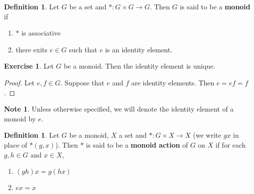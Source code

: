 \documentclass[12pt]{amsart}
\theoremstyle{definition}
\newtheorem{defn}[definition]{Definition}
\newtheorem{note}[definition]{Note}
\newtheorem{ex}[definition]{Exercise}
\begin{document}
	\begin{defn}
	Let $G$ be a set and $*: G \times G \rightarrow G$. Then $G$ is said to be a \textbf{monoid} if 
	\begin{enumerate}
	\item $*$ is associative
	\item there exits $e \in G$ such that $e$ is an identity element.
	\end{enumerate}
	\end{defn}	
	
	\begin{ex}
	Let $G$ be a monoid. Then the identity element is unique.
	\end{ex}
	
	\begin{proof}
	Let $e, f \in G$. Suppose that $e$ and $f$ are identity elements. Then $e = ef = f$.
	\end{proof}
	
	\begin{note}
	Unless otherwise specified, we will denote the identity element of a monoid by $e$.
	\end{note}
	
	\begin{defn}
	Let $G$ be a monoid, $X$ a set and $*: G \times X \rightarrow X$ (we write $gx$ in place of $*(g,x)$). Then $*$ is said to be a \textbf{monoid action} of $G$ on $X$ if for each $g,h \in G$ and $x \in X$,
	\begin{enumerate}
	\item $(gh)x = g(hx)$
	\item $ex = x$
	\end{enumerate}
	\end{defn}
	
	
	
	
	
	
	
	
	
	
	
	
	
	
	
	
	
	
	
	
	
	
	
\end{document}
